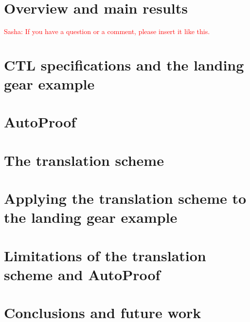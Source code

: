 \section{Overview and main results}
\label{sec:overview}
\textcolor{red}{Sasha: If you have a question or a comment, please insert it like this.}

\section{CTL specifications and the landing gear example}
\label{sec:landing_gear_example}

\cite{arcaini2014modeling}

\section{AutoProof}
\label{sec:autoproof}

\cite{tschannen2015autoproof}

\section{The translation scheme}
\label{sec:translation_scheme}

\section{Applying the translation scheme to the landing gear example}
\label{sec:applying_to_example}

\section{Limitations of the translation scheme and AutoProof}
\label{sec:limitations}



\section{Conclusions and future work}
\label{sec:conclusions}


{{{
	
	
}}}


